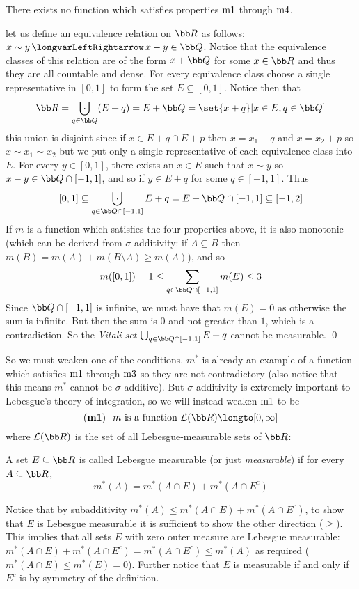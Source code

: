 \bprop[title=The Vitali Set]

    There exists no function which satisfies properties $\rm m1$ through $\rm m4$.

\eprop

\Proof let us define an equivalence relation on ${\bb R}$ as follows: $x\sim y\iff x-y\in{\bb Q}$.
Notice that the equivalence classes of this relation are of the form $x+{\bb Q}$ for some $x\in{\bb R}$ and thus they are all countable and dense.
For every equivalence class choose a single representative in $[0,1]$ to form the set $E\subseteq[0,1]$.
Notice then that
$$ {\bb R} = \bigdcup_{q\in{\bb Q}}(E+q) = E+{\bb Q} = \set{x+q}[x\in E,q\in{\bb Q}] $$
this union is disjoint since if $x\in E+q\cap E+p$ then $x=x_1+q$ and $x=x_2+p$ so $x\sim x_1\sim x_2$ but we put only a single representative of each equivalence class into $E$.
For every $y\in[0,1]$, there exists an $x\in E$ such that $x\sim y$ so $x-y\in{\bb Q}\cap[-1,1]$, and so if $y\in E+q$ for some $q\in[-1,1]$.
Thus
$$ [0,1] \subseteq \bigdcup_{q\in{\bb Q}\cap[-1,1]}E+q = E + {\bb Q}\cap[-1,1] \subseteq [-1,2] $$
If $m$ is a function which satisfies the four properties above, it is also monotonic (which can be derived from $\sigma$-additivity: if $A\subseteq B$ then $m(B)=m(A)+m(B\setminus A)\geq m(A)$), and so
$$ m([0,1]) = 1 \leq \sum_{q\in{\bb Q}\cap[-1,1]}m(E) \leq 3 $$
Since ${\bb Q}\cap[-1,1]$ is infinite, we must have that $m(E)=0$ as otherwise the sum is infinite.
But then the sum is $0$ and not greater than $1$, which is a contradiction.
So the {\it Vitali set\/} $\bigcup_{q\in{\bb Q}\cap[-1,1]}E+q$ cannot be measurable.
\qed

So we must weaken one of the conditions.
$m^*$ is already an example of a function which satisfies $\rm m1$ through $\rm m3$ so they are not contradictory (also notice that this means $m^*$ cannot be $\sigma$-additive).
But $\sigma$-additivity is extremely important to Lebesgue's theory of integration, so we will instead weaken $\rm m1$ to be
$$ \hbox{$({\bf m1})$\kern.25cm $m$ is a function ${\cal L}({\bb R})\longto[0,\infty]$} $$
where ${\cal L}({\bb R})$ is the set of all Lebesgue-measurable sets of ${\bb R}$:

\bdefn[title=Carath\'eodory]

    A set $E\subseteq{\bb R}$ is called {\emphcolor Lebesgue measurable} (or just {\it measurable}) if for every $A\subseteq{\bb R}$,
    $$ m^*(A)=m^*(A\cap E)+m^*(A\cap E^c) $$

\edefn

Notice that by subadditivity $m^*(A)\leq m^*(A\cap E)+m^*(A\cap E^c)$, to show that $E$ is Lebesgue measurable it is sufficient to show the other direction ($\geq$).
This implies that all sets $E$ with zero outer measure are Lebesgue measurable: $m^*(A\cap E)+m^*(A\cap E^c)=m^*(A\cap E^c)\leq m^*(A)$ as required ($m^*(A\cap E)\leq m^*(E)=0$).
Further notice that $E$ is measurable if and only if $E^c$ is by symmetry of the definition.

